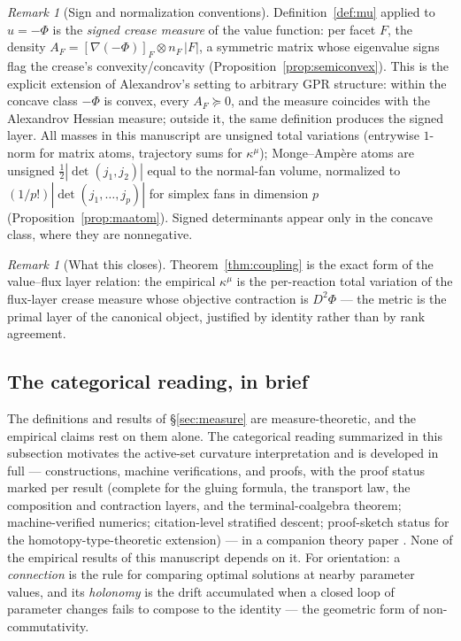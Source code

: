 \documentclass[11pt,a4paper]{article}
\theoremstyle{plain}
\theoremstyle{definition}
\theoremstyle{remark}
\newtheorem{remark}[theorem]{Remark}
\newcommand{\kmu}{\kappa^{\mu}}
\begin{document}
\begin{remark}[Sign and normalization conventions]\label{rem:conventions}
Definition~\ref{def:mu} applied to $u = -\Phi$ is the \emph{signed
crease measure} of the value function: per facet $F$, the density
$A_F = [\nabla(-\Phi)]_F \otimes n_F\,|F|$, a symmetric matrix whose
eigenvalue signs flag the crease's convexity/concavity
(Proposition~\ref{prop:semiconvex}). This is the explicit extension
of Alexandrov's setting to arbitrary GPR structure: within the
concave class $-\Phi$ is convex, every $A_F \succeq 0$, and the
measure coincides with the Alexandrov Hessian measure; outside it,
the same definition produces the signed layer. All masses in this
manuscript are unsigned total variations (entrywise $1$-norm for
matrix atoms, trajectory sums for $\kmu$); Monge--Amp\`ere atoms are
unsigned $\tfrac12|\det(j_1, j_2)|$ equal to the normal-fan volume,
normalized to $(1/p!)|\det(j_1,\dots,j_p)|$ for simplex fans in
dimension $p$ (Proposition~\ref{prop:maatom}). Signed determinants
appear only in the concave class, where they are nonnegative.
\end{remark}

\begin{remark}[What this closes]\label{rem:closes}
Theorem~\ref{thm:coupling} is the exact form of the value--flux layer relation: the empirical $\kmu$ is the
per-reaction total variation of the flux-layer crease measure whose
objective contraction is $D^2\Phi$ --- the metric is the primal
layer of the canonical object, justified by identity rather than by
rank agreement.
\end{remark}

\subsection{The categorical reading, in brief}\label{sec:categorical}

The definitions and results of \S\ref{sec:measure} are
measure-theoretic, and the empirical claims rest on them alone. The
categorical reading summarized in this subsection motivates the
active-set curvature interpretation and is developed in full ---
constructions, machine verifications, and proofs, with the proof
status marked per result (complete for the gluing formula, the
transport law, the composition and contraction layers, and the
terminal-coalgebra theorem; machine-verified numerics;
citation-level stratified descent; proof-sketch status for the
homotopy-type-theoretic extension) --- in a companion theory paper
\citep{zai2026categorical}. None of the empirical results of this
manuscript depends on it. For orientation: a \emph{connection} is
the rule for comparing optimal solutions at nearby parameter values,
and its \emph{holonomy} is the drift accumulated when a closed loop of
parameter changes fails to compose to the identity --- the geometric
form of non-commutativity.
\end{document}
